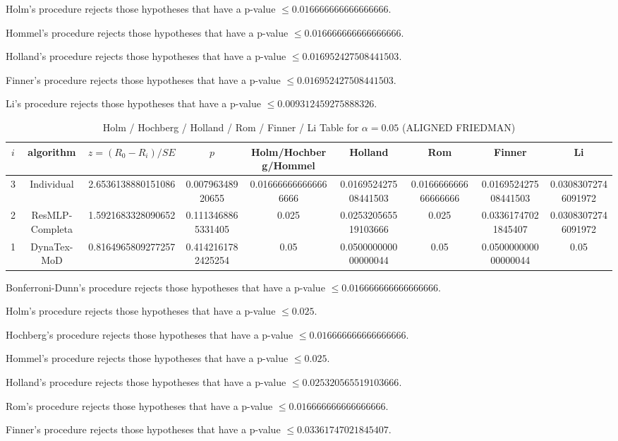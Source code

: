 \documentclass[a4paper,10pt]{article}
\begin{document}
\begin{landscape}
Holm's procedure rejects those hypotheses that have a p-value $\le0.016666666666666666$.


Hommel's procedure rejects those hypotheses that have a p-value $\le0.016666666666666666$.


Holland's procedure rejects those hypotheses that have a p-value $\le0.016952427508441503$.


Finner's procedure rejects those hypotheses that have a p-value $\le0.016952427508441503$.


Li's procedure rejects those hypotheses that have a p-value $\le0.009312459275888326$.



\newpage

\begin{table}[!htp]
\centering\scriptsize
\caption{Holm / Hochberg / Holland / Rom / Finner / Li Table for $\alpha=0.05$ (ALIGNED FRIEDMAN)}
\begin{tabular}{ccccccccc}
$i$&algorithm&$z=(R_0 - R_i)/SE$&$p$&Holm/Hochberg/Hommel&Holland&Rom&Finner&Li\\
\hline
3&Individual&2.6536138880151086&0.00796348920655&0.016666666666666666&0.016952427508441503&0.016666666666666666&0.016952427508441503&0.03083072746091972\\
2&ResMLP-Completa&1.5921683328090652&0.1113468865331405&0.025&0.025320565519103666&0.025&0.03361747021845407&0.03083072746091972\\
1&DynaTex-MoD&0.8164965809277257&0.4142161782425254&0.05&0.050000000000000044&0.05&0.050000000000000044&0.05\\
\hline
\end{tabular}
\end{table}
Bonferroni-Dunn's procedure rejects those hypotheses that have a p-value $\le0.016666666666666666$.


Holm's procedure rejects those hypotheses that have a p-value $\le0.025$.


Hochberg's procedure rejects those hypotheses that have a p-value $\le0.016666666666666666$.


Hommel's procedure rejects those hypotheses that have a p-value $\le0.025$.


Holland's procedure rejects those hypotheses that have a p-value $\le0.025320565519103666$.


Rom's procedure rejects those hypotheses that have a p-value $\le0.016666666666666666$.


Finner's procedure rejects those hypotheses that have a p-value $\le0.03361747021845407$.



\end{landscape}
\end{document}
